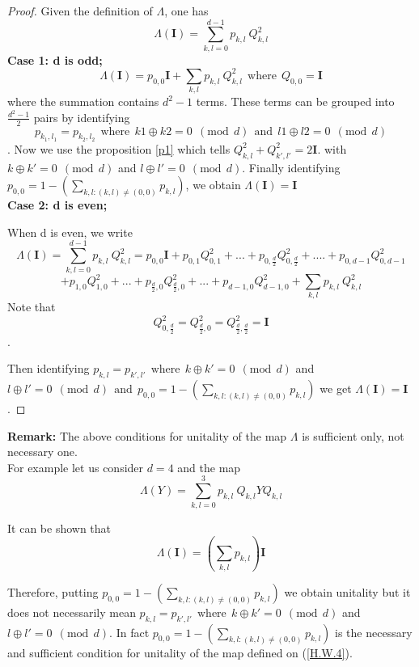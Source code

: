 \documentclass[12pt]{amsart}
\numberwithin{equation}{section}
\begin{document}
\begin{proof}
    Given the definition of $\Lambda$, one has
    \[\Lambda(\mathbf{I})=\sum_{k,l=0}^{d-1} p_{k,l}~ Q^2_{k,l} \]
    \textbf{Case 1: d is odd;}
    \[\Lambda(\mathbf{I})=p_{0,0} \mathbf{I}+\sum_{k,l} p_{k,l}~ Q^2_{k,l} ~~\text{where}~~ Q_{0,0}=\mathbf{I} \]
    where the summation contains $d^2-1$ terms. These terms can be grouped into $\frac{d^2-1}{2}$ pairs by identifying \[p_{k_1,l_1}=p_{k_2,l_2} ~~\text{where}~~ k1\oplus k2= 0~~ \left(\text{mod}~~ d\right)~~ \text{and}~~  l1\oplus l2=0 ~~\left(\text{mod}~~ d\right)\].
    Now we use the proposition \ref{p1} which tells $   Q_{k,l}^2 + Q_{k',l'}^2 = 2 \mathbf{I} . $ with $k\oplus k'= 0~~ \left(\text{mod}~~ d\right)$ and  $l\oplus l'=0 ~~\left(\text{mod}~~ d\right)$. Finally identifying $p_{0,0}=1-\left( \sum_{k,l: (k,l)\neq (0,0)} p_{k,l} \right)$, we obtain $\Lambda(\mathbf{I})=\mathbf{I}$\\

\textbf{Case 2: d is even;}

When d is even, we write 
\[\Lambda(\mathbf{I})=\sum_{k,l=0}^{d-1} p_{k,l}~ Q^2_{k,l}=p_{0,0} \mathbf{I} + p_{0,1} Q^2_{0,1}+...+p_{0,\frac{d}{2}} Q^2_{0,\frac{d}{2}}+....+p_{0,d-1} Q^2_{0,d-1} \]
\[+p_{1,0} Q^2_{1,0}+...+p_{\frac{d}{2},0} Q^2_{\frac{d}{2},0}+...+p_{d-1,0} Q^2_{d-1,0}+ \sum_{k,l} p_{k,l}~ Q^2_{k,l}\]
    Note that \[Q^2_{0,\frac{d}{2}}=Q^2_{\frac{d}{2},0}=Q^2_{\frac{d}{2},\frac{d}{2}}=\mathbf{I}\].

    Then identifying $p_{k,l}=p_{k',l'}~~ \text{where}~~k\oplus k'= 0~~ \left(\text{mod}~~ d\right)$ and  $l\oplus l'=0 ~~\left(\text{mod}~~ d\right) ~~ \text{and}~~ p_{0,0}=1-\left( \sum_{k,l: (k,l)\neq (0,0)} p_{k,l} \right)$ we get $\Lambda(\mathbf{I})=\mathbf{I}$.
\end{proof}
\vspace{1cm}

\textbf{Remark:} The above conditions for unitality of the map $\Lambda$ is sufficient only, not necessary one.\\

For example let us consider $d=4$ and the map
\begin{equation} \label{H.W.4}
    \Lambda(Y)=\sum^3_{k,l=0} p_{k,l}~Q_{k,l} Y Q_{k,l}
\end{equation}

It can be shown that 
\[\Lambda(\mathbf{I})=\left( \sum_{k,l} p_{k,l} \right) \mathbf{I}\]

Therefore, putting $p_{0,0}=1-\left( \sum_{k,l: (k,l)\neq (0,0)} p_{k,l} \right)$ we obtain unitality but it does not necessarily mean $p_{k,l}=p_{k',l'}~~ \text{where}~~k\oplus k'= 0~~ \left(\text{mod}~~ d\right)$ and $   l\oplus l'=0 ~~\left(\text{mod}~~ d\right)$. In fact $p_{0,0}=1-\left( \sum_{k,l: (k,l)\neq (0,0)} p_{k,l} \right)$  is the necessary and sufficient condition for unitality of the map defined on (\ref{H.W.4}).\\
\end{document}
